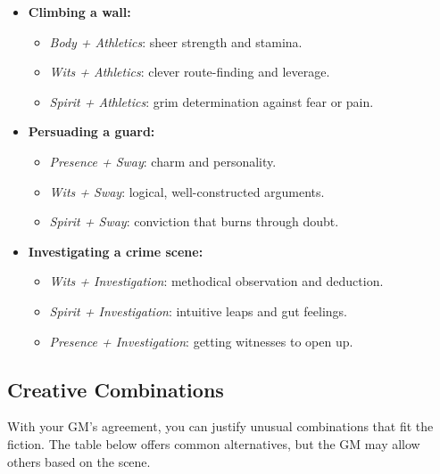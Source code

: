 \begin{itemize}
  \item \textbf{Climbing a wall:}
    \begin{itemize}
      \item \textit{Body + Athletics}: sheer strength and stamina.
      \item \textit{Wits + Athletics}: clever route-finding and leverage.
      \item \textit{Spirit + Athletics}: grim determination against fear or pain.
    \end{itemize}
  \item \textbf{Persuading a guard:}
    \begin{itemize}
      \item \textit{Presence + Sway}: charm and personality.
      \item \textit{Wits + Sway}: logical, well-constructed arguments.
      \item \textit{Spirit + Sway}: conviction that burns through doubt.
    \end{itemize}
  \item \textbf{Investigating a crime scene:}
    \begin{itemize}
      \item \textit{Wits + Investigation}: methodical observation and deduction.
      \item \textit{Spirit + Investigation}: intuitive leaps and gut feelings.
      \item \textit{Presence + Investigation}: getting witnesses to open up.
    \end{itemize}
\end{itemize}

\subsection{Creative Combinations}
\label{sec:creative-dice-pools}
With your GM's agreement, you can justify unusual combinations that fit the
fiction. The table below offers common alternatives, but the GM may allow
others based on the scene.

